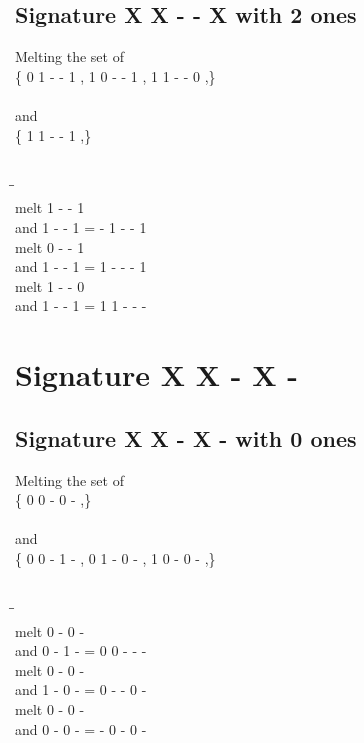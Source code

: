 \documentclass{article}
\begin{document}
\subsection{Signature X X - - X with 2 ones}
Melting the set of\\
\{ 0  1  -  -  1 , 1  0  -  -  1 , 1  1  -  -  0 ,\}\\\\
and\\
\{ 1  1  -  -  1 ,\}\\\\
\begin{tabbing}
\hspace{3cm}\=\hspace{3cm}\=\hspace{3cm}\\[1cm]
melt  1  -  -  1 \\
and  1  -  -  1 \>
 =  -  1  -  -  1 \\[1mm]
melt  0  -  -  1 \\
and  1  -  -  1 \>
 =  1  -  -  -  1 \\[1mm]
melt  1  -  -  0 \\
and  1  -  -  1 \>
 =  1  1  -  -  - \\[1mm]
\end{tabbing}
\newpage
\section{Signature X X - X - }
\subsection{Signature X X - X - with 0 ones}
Melting the set of\\
\{ 0  0  -  0  - ,\}\\\\
and\\
\{ 0  0  -  1  - , 0  1  -  0  - , 1  0  -  0  - ,\}\\\\
\begin{tabbing}
\hspace{3cm}\=\hspace{3cm}\=\hspace{3cm}\\[1cm]
melt  0  -  0  - \\
and  0  -  1  - \>
 =  0  0  -  -  - \\[1mm]
melt  0  -  0  - \\
and  1  -  0  - \>
 =  0  -  -  0  - \\[1mm]
melt  0  -  0  - \\
and  0  -  0  - \>
 =  -  0  -  0  - \\[1mm]
\end{tabbing}
\newpage
\end{document}
